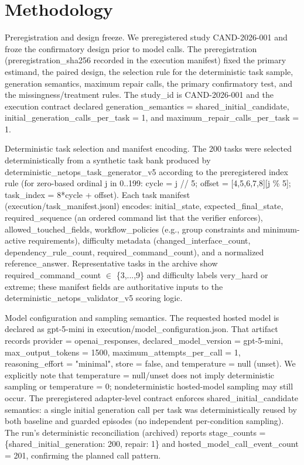 \documentclass[conference]{IEEEtran}
\begin{document}
\section{Methodology}
Preregistration and design freeze. We preregistered study CAND-2026-001 and froze the confirmatory design prior to model calls. The preregistration (preregistration\_sha256 recorded in the execution manifest) fixed the primary estimand, the paired design, the selection rule for the deterministic task sample, generation semantics, maximum repair calls, the primary confirmatory test, and the missingness/treatment rules. The study\_id is CAND-2026-001 and the execution contract declared generation\_semantics = shared\_initial\_candidate, initial\_generation\_calls\_per\_task = 1, and maximum\_repair\_calls\_per\_task = 1.

Deterministic task selection and manifest encoding. The 200 tasks were selected deterministically from a synthetic task bank produced by deterministic\_netops\_task\_generator\_v5 according to the preregistered index rule (for zero-based ordinal j in 0..199: cycle = j // 5; offset = [4,5,6,7,8][j \% 5]; task\_index = 8*cycle + offset). Each task manifest (execution/task\_manifest.jsonl) encodes: initial\_state, expected\_final\_state, required\_sequence (an ordered command list that the verifier enforces), allowed\_touched\_fields, workflow\_policies (e.g., group constraints and minimum-active requirements), difficulty metadata (changed\_interface\_count, dependency\_rule\_count, required\_command\_count), and a normalized reference\_answer. Representative tasks in the archive show required\_command\_count \ensuremath{\in} \{3,...,9\} and difficulty labels very\_hard or extreme; these manifest fields are authoritative inputs to the deterministic\_netops\_validator\_v5 scoring logic.

Model configuration and sampling semantics. The requested hosted model is declared as gpt-5-mini in execution/model\_configuration.json. That artifact records provider = openai\_responses, declared\_model\_version = gpt-5-mini, max\_output\_tokens = 1500, maximum\_attempts\_per\_call = 1, reasoning\_effort = "minimal", store = false, and temperature = null (unset). We explicitly note that temperature = null/unset does not imply deterministic sampling or temperature = 0; nondeterministic hosted-model sampling may still occur. The preregistered adapter-level contract enforces shared\_initial\_candidate semantics: a single initial generation call per task was deterministically reused by both baseline and guarded episodes (no independent per-condition sampling). The run's deterministic reconciliation (archived) reports stage\_counts = \{shared\_initial\_generation: 200, repair: 1\} and hosted\_model\_call\_event\_count = 201, confirming the planned call pattern.
\end{document}
